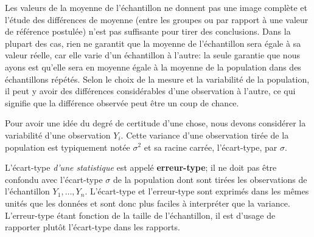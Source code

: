 \documentclass[
  11pt,
  letterpaper,
]{scrbook}
\theoremstyle{plain}
\theoremstyle{plain}
\theoremstyle{definition}
\theoremstyle{definition}
\theoremstyle{remark}
\begin{document}
Les valeurs de la moyenne de l'échantillon ne donnent pas une image
complète et l'étude des différences de moyenne (entre les groupes ou par
rapport à une valeur de référence postulée) n'est pas suffisante pour
tirer des conclusions. Dans la plupart des cas, rien ne garantit que la
moyenne de l'échantillon sera égale à sa valeur réelle, car elle varie
d'un échantillon à l'autre: la seule garantie que nous ayons est qu'elle
sera en moyenne égale à la moyenne de la population dans des
échantillons répétés. Selon le choix de la mesure et la variabilité de
la population, il peut y avoir des différences considérables d'une
observation à l'autre, ce qui signifie que la différence observée peut
être un coup de chance.

Pour avoir une idée du degré de certitude d'une chose, nous devons
considérer la variabilité d'une observation \(Y_i.\) Cette variance
d'une observation tirée de la population est typiquement notée
\(\sigma^2\) et sa racine carrée, l'écart-type, par \(\sigma.\)

L'écart-type \emph{d'une statistique} est appelé \textbf{erreur-type};
il ne doit pas être confondu avec l'écart-type \(\sigma\) de la
population dont sont tirées les observations de l'échantillon
\(Y_1, \ldots, Y_n.\) L'écart-type et l'erreur-type sont exprimés dans
les mêmes unités que les données et sont donc plus faciles à interpréter
que la variance. L'erreur-type étant fonction de la taille de
l'échantillon, il est d'usage de rapporter plutôt l'écart-type dans les
rapports.
\end{document}
